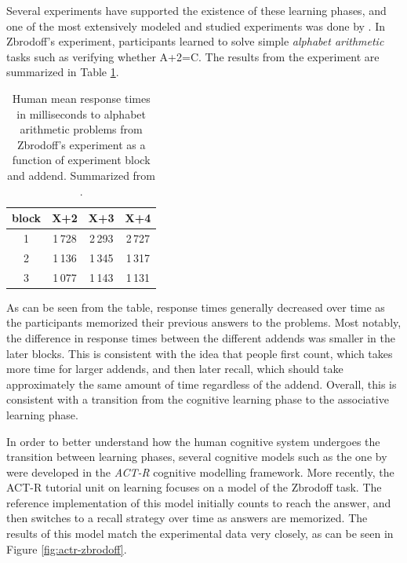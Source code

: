 \documentclass[10pt, a4paper, twocolumn]{article}
\begin{document}
Several experiments have supported the existence of these learning phases, and one of the most extensively modeled and studied experiments was done by \cite{Zbrodoff1995}. In Zbrodoff's experiment, participants learned to solve simple \emph{alphabet arithmetic} tasks such as verifying whether A+2=C. The results from the experiment are summarized in Table \ref{table:zbrodoff}. 

\begin{table}[h]
	\centering
	\begin{tabular}{cccc}
		block & X+2    & X+3    & X+4    \\\hline
		1     & 1\,728 & 2\,293 & 2\,727 \\
		2     & 1\,136 & 1\,345 & 1\,317 \\
		3     & 1\,077 & 1\,143 & 1\,131 \\
	\end{tabular}
	\caption{Human mean response times in milliseconds to alphabet arithmetic problems from Zbrodoff's experiment as a function of experiment block and addend. Summarized from \cite{Zbrodoff1995}.}
	\label{table:zbrodoff}
\end{table}

As can be seen from the table, response times generally decreased over time as the participants memorized their previous answers to the problems. Most notably, the difference in response times between the different addends was smaller in the later blocks. This is consistent with the idea that people first count, which takes more time for larger addends, and then later recall, which should take approximately the same amount of time regardless of the addend. Overall, this is consistent with a transition from the cognitive learning phase to the associative learning phase.

In order to better understand how the human cognitive system undergoes the transition between learning phases, several cognitive models such as the one by \cite{Lebiere1999} were developed in the \emph{ACT-R} cognitive modelling framework. More recently, the ACT-R tutorial unit on learning focuses on a model of the Zbrodoff task. The reference implementation of this model initially counts to reach the answer, and then switches to a recall strategy over time as answers are memorized. The results of this model match the experimental data very closely, as can be seen in Figure \ref{fig:actr-zbrodoff}.
\end{document}
